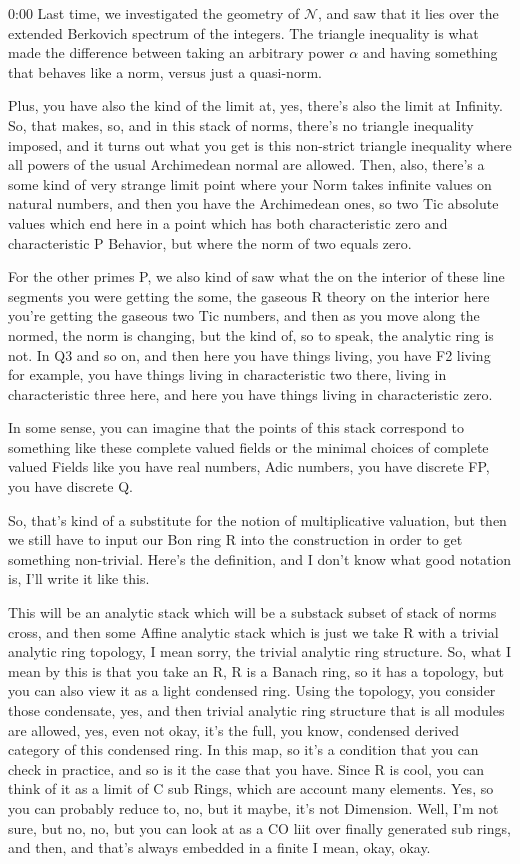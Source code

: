\begin{unfinished}{0:00}
Last time, we investigated the geometry of $\mathcal{N}$, and saw that it lies over the extended Berkovich spectrum of the integers. The triangle inequality is what made the difference between taking an arbitrary power $\alpha$ and having something that behaves like a norm, versus just a quasi-norm.

Plus, you have also the kind of the limit at, yes, there's also the limit at Infinity. So, that makes, so, and in this stack of norms, there's no triangle inequality imposed, and it turns out what you get is this non-strict triangle inequality where all powers of the usual Archimedean normal are allowed. Then, also, there's a some kind of very strange limit point where your Norm takes infinite values on natural numbers, and then you have the Archimedean ones, so two Tic absolute values which end here in a point which has both characteristic zero and characteristic P Behavior, but where the norm of two equals zero.

For the other primes P, we also kind of saw what the on the interior of these line segments you were getting the some, the gaseous R theory on the interior here you're getting the gaseous two Tic numbers, and then as you move along the normed, the norm is changing, but the kind of, so to speak, the analytic ring is not. In Q3 and so on, and then here you have things living, you have F2 living for example, you have things living in characteristic two there, living in characteristic three here, and here you have things living in characteristic zero.

In some sense, you can imagine that the points of this stack correspond to something like these complete valued fields or the minimal choices of complete valued Fields like you have real numbers, Adic numbers, you have discrete FP, you have discrete Q.

So, that's kind of a substitute for the notion of multiplicative valuation, but then we still have to input our Bon ring R into the construction in order to get something non-trivial. Here's the definition, and I don't know what good notation is, I'll write it like this.

This will be an analytic stack which will be a substack subset of stack of norms cross, and then some Affine analytic stack which is just we take R with a trivial analytic ring topology, I mean sorry, the trivial analytic ring structure. So, what I mean by this is that you take an R, R is a Banach ring, so it has a topology, but you can also view it as a light condensed ring. Using the topology, you consider those condensate, yes, and then trivial analytic ring structure that is all modules are allowed, yes, even not okay, it's the full, you know, condensed derived category of this condensed ring.
In this map, so it's a condition that you can check in practice, and so is it the case that you have. Since R is cool, you can think of it as a limit of C sub Rings, which are account many elements. Yes, so you can probably reduce to, no, but it maybe, it's not Dimension. Well, I'm not sure, but no, no, but you can look at as a CO liit over finally generated sub rings, and then, and that's always embedded in a finite I mean, okay, okay.


\end{unfinished}
